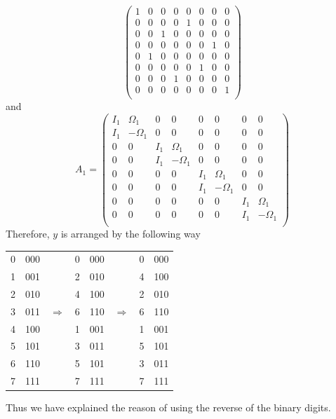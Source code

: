 \[\begin{pmatrix}
        1   &   0   &   0   &   0   &   0   &   0   &   0   &   0\\
        0   &   0   &   0   &   0   &   1   &   0   &   0   &   0\\
        0   &   0   &   1   &   0   &   0   &   0   &   0   &   0\\
        0   &   0   &   0   &   0   &   0   &   0   &   1   &   0\\
        0   &   1   &   0   &   0   &   0   &   0   &   0   &   0\\
        0   &   0   &   0   &   0   &   0   &   1   &   0   &   0\\
        0   &   0   &   0   &   1   &   0   &   0   &   0   &   0\\
        0   &   0   &   0   &   0   &   0   &   0   &   0   &   1\\
    \end{pmatrix}
\]
and \[
    A_1 = \begin{pmatrix}
        I_1     &\Omega_1   &   0   &   0   &   0   &   0   &   0   &   0\\
        I_1     &-\Omega_1  &   0   &   0   &   0   &   0   &   0   &   0\\
        0       &   0       &I_1     &\Omega_1 &   0   &   0   &   0   &   0\\
        0       &   0       &I_1     &-\Omega_1&   0   &   0   &   0   &   0\\
        0       &   0       &0       &   0       &I_1     &\Omega_1 &   0   &   0\\
        0       &   0       &0       &   0       &I_1     &-\Omega_1&   0   &   0\\
        0       &   0       &0       &   0       &0       &   0       &I_1     &\Omega_1 \\
        0       &   0       &0       &   0       &0       &   0       &I_1     &-\Omega_1\\
    \end{pmatrix}
\]
Therefore, $y$ is arranged by the following way
\begin{center}
\begin{tabular}{rrrrrrrr}
    0 & 000 &               & 0 & 000 &             & 0& 000     \\
    1 & 001 &               & 2 & 010 &             & 4& 100     \\
    2 & 010 &               & 4 & 100 &             & 2& 010     \\
    3 & 011 & $\Rightarrow$ & 6 & 110 &$\Rightarrow$& 6& 110     \\
    4 & 100 &               & 1 & 001 &             & 1& 001     \\
    5 & 101 &               & 3 & 011 &             & 5& 101     \\
    6 & 110 &               & 5 & 101 &             & 3& 011     \\
    7 & 111 &               & 7 & 111 &             & 7& 111     
\end{tabular}
\end{center}
Thus we have explained the reason of using the reverse of the binary digits.